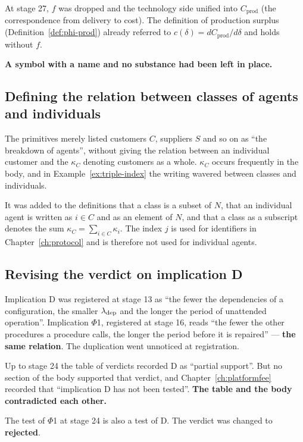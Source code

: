 At stage 27, $f$ was dropped and the technology side unified into $C_{\mathrm{prod}}$ (the
correspondence from delivery to cost). The definition of production surplus
(Definition~\ref{def:phi-prod}) already referred to $c(\delta)=dC_{\mathrm{prod}}/d\delta$ and
holds without $f$.

\textbf{A symbol with a name and no substance had been left in place.}

\subsection{Defining the relation between classes of agents and individuals}

The primitives merely listed customers $C$, suppliers $S$ and so on as ``the breakdown of
agents'', without giving the relation between an individual customer and the $\kappa_C$ denoting
customers as a whole. $\kappa_C$ occurs frequently in the body, and in
Example~\ref{ex:triple-index} the writing wavered between classes and individuals.

It was added to the definitions that a class is a subset of $N$, that an individual agent is
written as $i\in C$ and as an element of $N$, and that a class as a subscript denotes the sum
$\kappa_C=\sum_{i\in C}\kappa_i$. The index $j$ is used for identifiers in
Chapter~\ref{ch:protocol} and is therefore not used for individual agents.

\subsection{Revising the verdict on implication D}

Implication D was registered at stage 13 as ``the fewer the dependencies of a configuration, the
smaller $\lambda_{\rm dep}$ and the longer the period of unattended operation''. Implication $\Phi$1,
registered at stage 16, reads ``the fewer the other procedures a procedure calls, the longer the
period before it is repaired'' — \textbf{the same relation}. The duplication went unnoticed at
registration.

Up to stage 24 the table of verdicts recorded D as ``partial support''. But no section of the body
supported that verdict, and Chapter~\ref{ch:platformfee} recorded that ``implication D has not been
tested''. \textbf{The table and the body contradicted each other.}

The test of $\Phi$1 at stage 24 is also a test of D. The verdict was changed to \textbf{rejected}.

